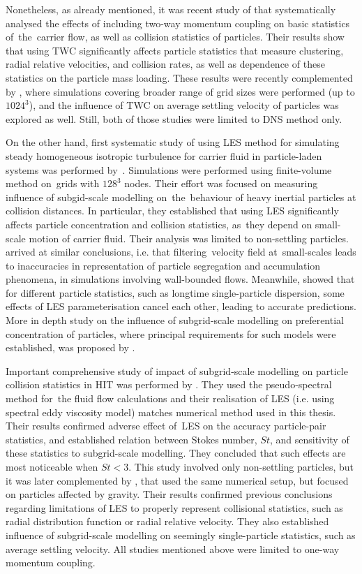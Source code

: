 \documentclass{pracamgren}
\begin{document}
Nonetheless, as already mentioned, it was recent study of \textcite{Rosa2020} that systematically analysed the effects of including two-way momentum coupling on basic statistics of~the~carrier flow, as well as collision statistics of particles.
Their results show that using TWC significantly affects particle statistics that measure clustering, radial relative velocities, and collision rates, as well as dependence of these statistics on the particle mass loading.
These results were recently complemented by \textcite{Rosa2022}, where simulations covering broader range of grid sizes were performed (up to $1024^3$), and the influence of TWC on average settling velocity of particles was explored as well. 
Still, both of those studies were limited to DNS method only.

On the other hand, first systematic study of using LES method for simulating steady homogeneous isotropic turbulence for carrier fluid in particle-laden systems was performed by~\textcite{Fede2006}.
Simulations were performed using finite-volume method on~grids with $128^3$ nodes.
Their effort was focused on measuring influence of subgid-scale modelling on~the~behaviour of heavy inertial particles at collision distances.
In particular, they established that using LES significantly affects particle concentration and collision statistics, as~they depend on small-scale motion of carrier fluid.
Their analysis was limited to non-settling particles.
\textcite{Marchioli2008} arrived at similar conclusions, i.e. that filtering~velocity field at~small-scales leads to inaccuracies in representation of particle segregation and accumulation phenomena, in simulations involving wall-bounded flows.
Meanwhile, \textcite{Yang2008} showed that for different particle statistics, such as longtime single-particle dispersion, some effects of LES parameterisation cancel each other, leading to accurate predictions.
More in depth study on the influence of subgrid-scale modelling on preferential concentration of particles, where principal requirements for such models were established, was proposed by \textcite{Pozorski2009}.

Important comprehensive study of impact of subgrid-scale modelling on particle collision statistics in HIT was performed by \textcite{Jin2010}.
They used the pseudo-spectral method for~the fluid flow calculations and their realisation of LES (i.e. using spectral eddy viscosity model) matches numerical method used in this thesis.
Their results confirmed adverse effect of~LES on the accuracy particle-pair statistics, and established relation between Stokes number, $St$, and sensitivity of these statistics to subgrid-scale modelling.
They concluded that such effects are most noticeable when $St < 3$.
This study involved only non-settling particles, but it was later complemented by \textcite{Rosa2017}, that used the same numerical setup, but focused on particles affected by gravity.
Their results confirmed previous conclusions regarding limitations of LES to properly represent collisional statistics, such as radial distribution function or radial relative velocity.
They also established influence of subgrid-scale modelling on seemingly single-particle statistics, such as average settling velocity.
All studies mentioned above were limited to one-way momentum coupling.
\end{document}
